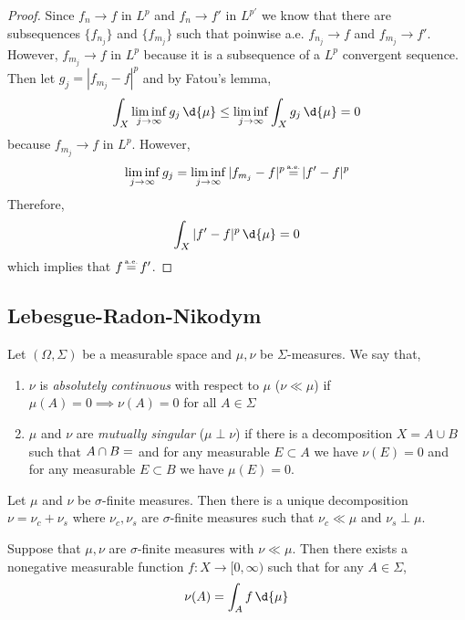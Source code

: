 \documentclass[12pt]{article}
\newcommand\eqae{\mathrel{\stackrel{\makebox[0pt]{\mbox{\normalfont\tiny a.e.}}}{=}}}
\begin{document}
\begin{proof}
Since $f_n \to f$ in $L^p$ and $f_n \to f'$ in $L^{p'}$ we know that there are subsequences $\{ f_{n_j} \}$ and $\{ f_{m_j} \}$ such that poinwise a.e. $f_{n_j} \to f$ and $f_{m_j} \to f'$. However, $f_{m_j} \to f$ in $L^p$ because it is a subsequence of a $L^p$ convergent sequence. Then let $g_j = |f_{m_j} - f|^p$ and by Fatou's lemma,
\[ \int_{X} 
\liminf_{j \to \infty} g_j \, \d{\mu} \le \liminf_{j \to \infty} \int_X g_j \, \d{\mu} = 0 \]
because $f_{m_j} \to f$ in $L^p$. However,
\[ \liminf_{j \to \infty} g_j = \liminf_{j \to \infty} |f_{m_j} - f|^p \eqae |f' - f|^p \]
Therefore,
\[ \int_X | f' - f |^p \, \d{\mu} = 0 \]
which implies that $f \eqae f'$.
\end{proof}

\subsection{Lebesgue-Radon-Nikodym}

\begin{defn}
Let $(\Omega, \Sigma)$ be a measurable space and $\mu, \nu$ be $\Sigma$-measures. We say that,
\begin{enumerate}
\item $\nu$ is \textit{absolutely continuous} with respect to $\mu$ ($\nu \ll \mu$) if $\mu(A) = 0 \implies \nu(A) = 0$ for all $A \in \Sigma$
\item $\mu$ and $\nu$ are \textit{mutually singular} ($\mu \perp \nu$) if there is a decomposition $X = A \cup B$ such that $A \cap B = \empty$ and for any measurable $E \subset A$ we have $\nu(E) = 0$ and for any measurable $E \subset B$ we have $\mu(E) = 0$.
\end{enumerate}
\end{defn}

\begin{theorem}[Lebesgue]
Let $\mu$ and $\nu$ be $\sigma$-finite measures. Then there is a unique decomposition $\nu = \nu_c + \nu_s$ where $\nu_c, \nu_s$ are $\sigma$-finite measures such that $\nu_c \ll \mu$ and $\nu_s \perp \mu$.
\end{theorem}

\begin{thm}
Suppose that $\mu, \nu$ are $\sigma$-finite measures with $\nu \ll \mu$. Then there exists a nonegative measurable function $f : X \to [0, \infty)$ such that for any $A \in \Sigma$,
\[ \nu(A) = \int_A f \, \d{\mu} \]
\end{thm}
\end{document}
